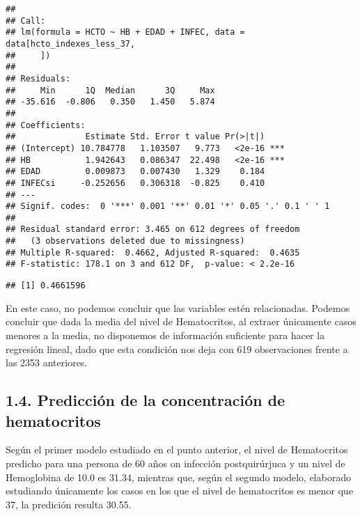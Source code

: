 \documentclass[]{article}
\newenvironment{Shaded}{\begin{snugshade}}{\end{snugshade}}
\newcommand{\DecValTok}[1]{\textcolor[rgb]{0.00,0.00,0.81}{#1}}
\newcommand{\KeywordTok}[1]{\textcolor[rgb]{0.13,0.29,0.53}{\textbf{#1}}}
\newcommand{\NormalTok}[1]{#1}
\newcommand{\OperatorTok}[1]{\textcolor[rgb]{0.81,0.36,0.00}{\textbf{#1}}}
\newcommand{\StringTok}[1]{\textcolor[rgb]{0.31,0.60,0.02}{#1}}
\begin{document}
\begin{verbatim}
## 
## Call:
## lm(formula = HCTO ~ HB + EDAD + INFEC, data = data[hcto_indexes_less_37, 
##     ])
## 
## Residuals:
##     Min      1Q  Median      3Q     Max 
## -35.616  -0.806   0.350   1.450   5.874 
## 
## Coefficients:
##              Estimate Std. Error t value Pr(>|t|)    
## (Intercept) 10.784778   1.103507   9.773   <2e-16 ***
## HB           1.942643   0.086347  22.498   <2e-16 ***
## EDAD         0.009873   0.007430   1.329    0.184    
## INFECsi     -0.252656   0.306318  -0.825    0.410    
## ---
## Signif. codes:  0 '***' 0.001 '**' 0.01 '*' 0.05 '.' 0.1 ' ' 1
## 
## Residual standard error: 3.465 on 612 degrees of freedom
##   (3 observations deleted due to missingness)
## Multiple R-squared:  0.4662, Adjusted R-squared:  0.4635 
## F-statistic: 178.1 on 3 and 612 DF,  p-value: < 2.2e-16
\end{verbatim}

\begin{Shaded}
\end{Shaded}

\begin{verbatim}
## [1] 0.4661596
\end{verbatim}

En este caso, no podemos concluir que las variables estén relacionadas.
Podemos concluir que dada la media del nivel de Hematocritos, al extraer
únicamente casos menores a la media, no disponemos de información
suficiente para hacer la regresión lineal, dado que esta condición nos
deja con 619 observaciones frente a las 2353 anteriores.

\hypertarget{predicciuxf3n-de-la-concentraciuxf3n-de-hematocritos}{%
\subsection{1.4. Predicción de la concentración de
hematocritos}\label{predicciuxf3n-de-la-concentraciuxf3n-de-hematocritos}}

Según el primer modelo estudiado en el punto anterior, el nivel de
Hematocritos predicho para una persona de 60 años on infección
postquirúrjuca y un nivel de Hemoglobina de 10.0 es 31.34, mientras que,
según el segundo modelo, elaborado estudiando únicamente los casos en
los que el nivel de hematocritos es menor que 37, la predición resulta
30.55.
\end{document}
